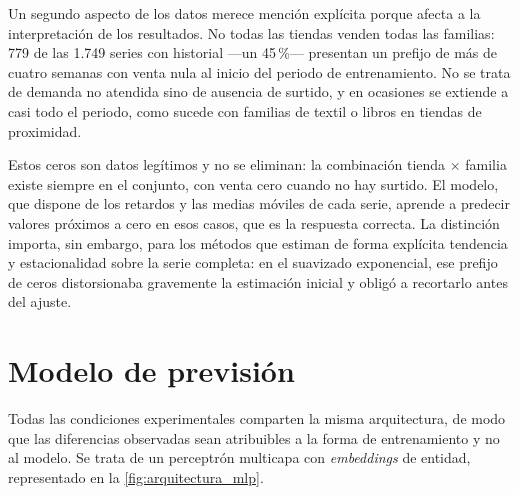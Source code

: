 Un segundo aspecto de los datos merece mención explícita porque afecta a la interpretación de los
resultados. No todas las tiendas venden todas las familias: 779 de las 1.749 series con historial
—un 45\,\%— presentan un prefijo de más de cuatro semanas con venta nula al inicio del periodo de
entrenamiento. No se trata de demanda no atendida sino de ausencia de surtido, y en ocasiones se
extiende a casi todo el periodo, como sucede con familias de textil o libros en tiendas de
proximidad.

Estos ceros son datos legítimos y no se eliminan: la combinación tienda × familia existe siempre en
el conjunto, con venta cero cuando no hay surtido. El modelo, que dispone de los retardos y las
medias móviles de cada serie, aprende a predecir valores próximos a cero en esos casos, que es la
respuesta correcta. La distinción importa, sin embargo, para los métodos que estiman de forma
explícita tendencia y estacionalidad sobre la serie completa: en el suavizado exponencial, ese
prefijo de ceros distorsionaba gravemente la estimación inicial y obligó a recortarlo antes del
ajuste.

\section{Modelo de previsión}

Todas las condiciones experimentales comparten la misma arquitectura, de modo que las diferencias
observadas sean atribuibles a la forma de entrenamiento y no al modelo. Se trata de un perceptrón
multicapa con \emph{embeddings} de entidad, representado en la \cref{fig:arquitectura_mlp}.

